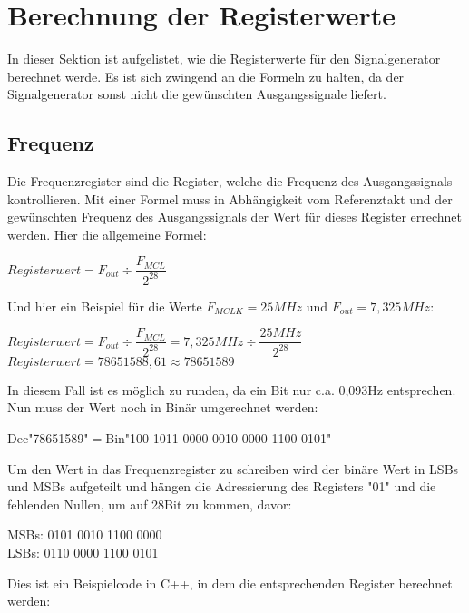 \section{Berechnung der Registerwerte}
In dieser Sektion ist aufgelistet, wie die Registerwerte für den Signalgenerator berechnet werde. Es ist sich zwingend an die Formeln zu halten, da der Signalgenerator sonst nicht die gewünschten Ausgangssignale liefert.
\subsection{Frequenz}
Die Frequenzregister sind die Register, welche die Frequenz des Ausgangssignals kontrollieren. Mit einer Formel muss in Abhängigkeit vom Referenztakt und der gewünschten Frequenz des Ausgangssignals der Wert für dieses Register errechnet werden. Hier die allgemeine Formel:\\

\begin{center}
$Registerwert=F_{out}\div \dfrac{F_{MCL}}{2^{28}}$\\
\end{center}
Und hier ein Beispiel für die Werte $F_{MCLK}=25MHz$ und $F_{out}= 7,325MHz$:\\
\begin{center}
$Registerwert=F_{out}\div \dfrac{F_{MCL}}{2^{28}}=7,325MHz\div \dfrac{25MHz}{2^{28}}$\\
\medskip
$Registerwert=78651588,61 \approx 78651589$\\
\end{center}
In diesem Fall ist es möglich zu runden, da ein Bit nur c.a. 0,093Hz entsprechen. Nun muss der Wert noch in Binär umgerechnet werden:\\
\begin{center}
Dec"78651589"$ = $Bin"100 1011 0000 0010 0000 1100 0101"\\
\end{center}
Um den Wert in das Frequenzregister zu schreiben wird der binäre Wert in LSBs und MSBs aufgeteilt und hängen die Adressierung des Registers "01" und die fehlenden Nullen, um auf 28Bit zu kommen, davor:
\begin{center}
MSBs: 0101 0010 1100 0000\\
LSBs: 0110 0000 1100 0101\\
\end{center}
\pagebreak
Dies ist ein Beispielcode in C++, in dem die entsprechenden Register berechnet werden:
\lstset{style=C}


